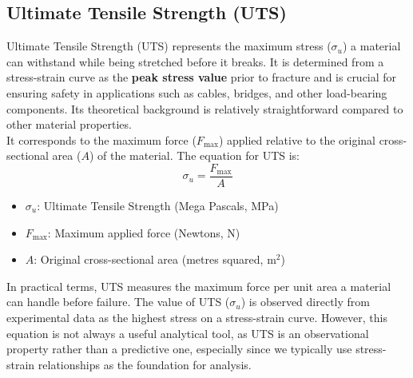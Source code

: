 \documentclass{article}
\begin{document}
\subsection{Ultimate Tensile Strength (UTS)}
Ultimate Tensile Strength (UTS) represents the maximum stress ($\sigma_{u}$) a material can withstand while being stretched before it breaks. It is determined from a stress-strain curve as the \textbf{peak stress value} prior to fracture and is crucial for ensuring safety in applications such as cables, bridges, and other load-bearing components. Its theoretical background is relatively straightforward compared to other material properties.\\[8pt]
It corresponds to the maximum force ($F_{\text{max}}$) applied relative to the original cross-sectional area ($A$) of the material. The equation for UTS is:
\begin{equation}
    \sigma_{u} = \frac{F_{\text{max}}}{A}
\end{equation}
\begin{itemize}[itemsep=-1mm]
    \item $\sigma_{u}$: Ultimate Tensile Strength (Mega Pascals, MPa)
    \item $F_{\text{max}}$: Maximum applied force (Newtons, N)
    \item $A$: Original cross-sectional area (metres squared, $\text{m}^2$)
\end{itemize}
In practical terms, UTS measures the maximum force per unit area a material can handle before failure. The value of UTS ($\sigma_{u}$) is observed directly from experimental data as the highest stress on a stress-strain curve. However, this equation is not always a useful analytical tool, as UTS is an observational property rather than a predictive one, especially since we typically use stress-strain relationships as the foundation for analysis.
\end{document}
